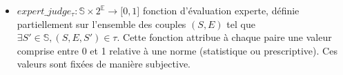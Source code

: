 \begin{itemize}
    \item $expert\_judge_\tau: \mathds{S} \times 2 ^{\mathds{E}}\to \lbrack 0, 1\rbrack$ fonction d'évaluation experte, définie partiellement sur l'ensemble des couples $(S,E)$ tel que $\exists S'\in\mathds{S},(S,E,S')\in \tau$. Cette fonction attribue à chaque paire une valeur comprise entre 0 et 1 relative à une norme (statistique ou prescriptive). Ces valeurs sont fixées de manière subjective.

\end{itemize}
